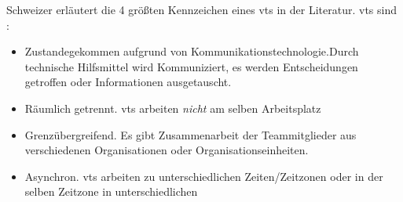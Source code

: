 \documentclass[a4paper,11pt]{article}%
\renewcommand{\\}{\vspace*{0.5\baselineskip} \newline}
\begin{document}
Schweizer \citep[p.270]{schweitzer2010conceptualizing} erläutert die 4 größten Kennzeichen eines \ac{vts} in der Literatur.
\ac{vts} sind :
\begin{itemize}
\item Zustandegekommen aufgrund von Kommunikationstechnologie.Durch technische Hilfsmittel wird Kommuniziert, es werden Entscheidungen getroffen oder Informationen ausgetauscht.
\item Räumlich getrennt. \ac{vts} arbeiten \textit{nicht} am selben Arbeitsplatz
\item Grenzübergreifend. Es gibt Zusammenarbeit der Teammitglieder aus verschiedenen Organisationen oder Organisationseinheiten.
\item Asynchron. \ac{vts} arbeiten zu unterschiedlichen Zeiten/Zeitzonen oder in der selben Zeitzone in unterschiedlichen
\end{itemize}
\end{document}

